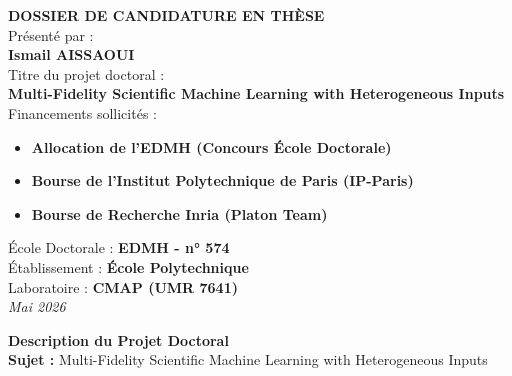 \documentclass[a4paper,11pt]{article}
\begin{document}
\begin{titlepage}
    \begin{center}
        \vspace*{2cm}
        {\Huge\bfseries\color{titleblue} DOSSIER DE CANDIDATURE EN THÈSE}\\[2cm]
        
        {\Large Présenté par :}\\[0.5cm]
        {\huge\bfseries Ismail AISSAOUI}\\[2cm]
        
        {\Large Titre du projet doctoral :}\\[0.5cm]
        {\Large\bfseries Multi-Fidelity Scientific Machine Learning with Heterogeneous Inputs}\\[2cm]
        
        {\Large Financements sollicités :}\\[0.5cm]
        \begin{itemize}[label=--]
            \item[] \textbf{Allocation de l'EDMH (Concours École Doctorale)}
            \item[] \textbf{Bourse de l'Institut Polytechnique de Paris (IP-Paris)}
            \item[] \textbf{Bourse de Recherche Inria (Platon Team)}
        \end{itemize}

        \vfill
        
        {\Large École Doctorale : \textbf{EDMH - n° 574}}\\[0.3cm]
        {\Large Établissement : \textbf{École Polytechnique}}\\[0.3cm]
        {\Large Laboratoire : \textbf{CMAP (UMR 7641)}}\\[2cm]
        
        \textit{Mai 2026}
    \end{center}
\end{titlepage}

\newpage

\begin{center}
    {\Large\bfseries Description du Projet Doctoral}\\[10pt]
    \textbf{Sujet :} Multi-Fidelity Scientific Machine Learning with Heterogeneous Inputs
\end{center}
\end{document}
